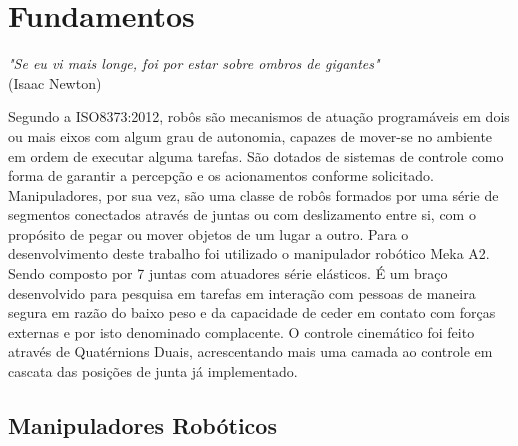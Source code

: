 \chapter{Fundamentos}\label{ch:teory-reference}

\begin{flushright}
\textit{"Se eu vi mais longe, foi por estar sobre ombros de gigantes"}\\ (Isaac Newton)
\end{flushright}



Segundo a ISO8373:2012, robôs são mecanismos de atuação programáveis em dois ou mais eixos com algum grau de autonomia, capazes de mover-se no ambiente em ordem de executar alguma tarefas. São dotados de sistemas de controle como forma de garantir a percepção e os acionamentos conforme solicitado. Manipuladores, por sua vez, são uma classe de robôs formados por uma série de segmentos conectados através de juntas ou com deslizamento entre si, com o propósito de pegar ou mover objetos de um lugar a outro. Para o desenvolvimento deste trabalho foi utilizado o manipulador robótico Meka A2. Sendo composto por 7 juntas com atuadores série elásticos. É um braço desenvolvido para pesquisa em tarefas em interação com pessoas de maneira segura em razão do baixo peso e da capacidade de ceder em contato com forças externas e por isto denominado complacente. O controle cinemático foi feito através de Quatérnions Duais, acrescentando mais uma camada ao controle em cascata das posições de junta já implementado.

\section{Manipuladores Robóticos} 

